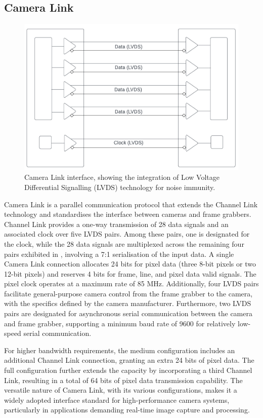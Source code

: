 \subsection{Camera Link}
\begin{figure}[!h]
\centering
\includegraphics[width=0.7\linewidth]{Images/CameraLink.png}
\caption[Camera Link Architecture]{Camera Link interface, showing the integration of Low Voltage Differential Signalling (LVDS) technology for noise immunity.}
\label{fig:CameraLink}
\end{figure} 

Camera Link\cite{CameraLink} is a parallel communication protocol that extends the Channel Link technology and standardises the interface between cameras and frame grabbers. Channel Link provides a one-way transmission of 28 data signals and an associated clock over five LVDS pairs. Among these pairs, one is designated for the clock, while the 28 data signals are multiplexed across the remaining four pairs exhibited in , involving a 7:1 serialisation of the input data. A single Camera Link connection allocates 24 bits for pixel data (three 8-bit pixels or two 12-bit pixels) and reserves 4 bits for frame, line, and pixel data valid signals. The pixel clock operates at a maximum rate of 85 MHz. Additionally, four LVDS pairs facilitate general-purpose camera control from the frame grabber to the camera, with the specifics defined by the camera manufacturer. Furthermore, two LVDS pairs are designated for asynchronous serial communication between the camera and frame grabber, supporting a minimum baud rate of 9600 for relatively low-speed serial communication.

For higher bandwidth requirements, the medium configuration includes an additional Channel Link connection, granting an extra 24 bits of pixel data. The full configuration further extends the capacity by incorporating a third Channel Link, resulting in a total of 64 bits of pixel data transmission capability. The versatile nature of Camera Link, with its various configurations, makes it a widely adopted interface standard for high-performance camera systems, particularly in applications demanding real-time image capture and processing.






